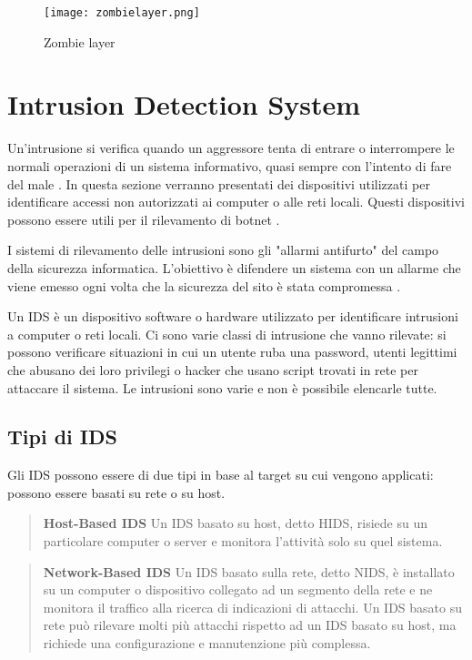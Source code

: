 \documentclass[../main.tex]{subfiles}
\begin{document}
\begin{figure}[H]
				\centering
				\texttt{[image: zombielayer.png]}
				\caption{Zombie layer}
				\label{fig:zombieLayer}
\end{figure}

\section{Intrusion Detection System}
Un'intrusione si verifica quando un aggressore tenta di entrare o interrompere le normali operazioni di un sistema informativo, quasi sempre con l'intento di fare del male \cite{idsbook}.
In questa sezione verranno presentati dei dispositivi utilizzati per identificare accessi non autorizzati ai computer o alle reti locali. Questi dispositivi possono essere utili per il rilevamento di botnet \cite{botnetdetection}.


I sistemi di rilevamento delle intrusioni sono gli "allarmi antifurto" del campo della sicurezza informatica. L'obiettivo è difendere un sistema con un allarme che viene emesso ogni volta che la sicurezza del sito è stata compromessa \cite{IDS}. 

Un IDS è un dispositivo software o hardware utilizzato per identificare intrusioni a computer o reti locali.
Ci sono varie classi di intrusione che vanno rilevate: si possono verificare situazioni in cui un utente ruba una password, utenti legittimi che abusano dei loro privilegi o hacker che usano script trovati in rete per attaccare il sistema. Le intrusioni sono varie e non è possibile elencarle tutte.

\subsection{Tipi di IDS}
Gli IDS possono essere di due tipi in base al target su cui vengono applicati: possono essere basati su rete o su host.
\begin{verse}
				\textbf{Host-Based IDS} Un IDS basato su host, detto HIDS, risiede su un particolare computer o server e monitora l'attività solo su quel sistema.
\end{verse}

\begin{verse}
				\textbf{Network-Based IDS} Un IDS basato sulla rete, detto NIDS, è installato su un computer o dispositivo collegato ad un segmento della rete e ne monitora il traffico alla ricerca di indicazioni di attacchi. Un IDS basato su rete può rilevare molti più attacchi rispetto ad un IDS basato su host, ma richiede una configurazione e manutenzione più complessa.
\end{verse}
\end{document}
